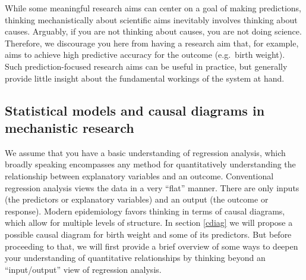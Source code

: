 While some meaningful research aims can center on a goal of making predictions, thinking mechanistically about scientific aims inevitably involves thinking about causes.  Arguably, if you are not thinking about causes, you are not doing science.  Therefore, we discourage you here from having a research aim that, for example, aims to achieve high predictive accuracy for the outcome (e.g.\ birth weight).  Such prediction-focused research aims can be useful in practice, but generally provide little insight about the fundamental workings of the system at hand.

\subsection{Statistical models and causal diagrams in mechanistic research}

We assume that you have a basic understanding of regression analysis, which broadly speaking encompasses any method for quantitatively understanding the relationship between explanatory variables and an outcome.  Conventional regression analysis views the data in a very ``flat'' manner.  There are only inputs (the predictors or explanatory variables) and an output (the outcome or response). Modern epidemiology favors thinking in terms of causal diagrams, which allow for multiple levels of structure.  In section \ref{cdiag} we will propose a possible causal diagram for birth weight and some of its predictors.  But before proceeding to that, we will first provide a brief overview of some ways to deepen your understanding of quantitative relationships by thinking beyond an ``input/output'' view of regression analysis.

